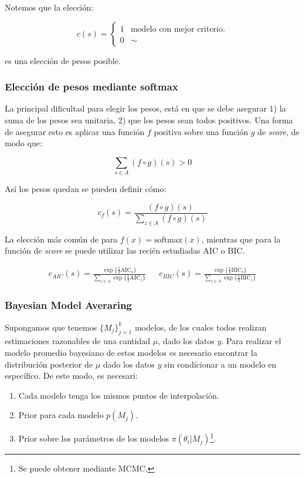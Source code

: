 Notemos que la elección:

\begin{equation}
c(s) =
\begin{cases}
1 & \text{modelo con mejor criterio.}\\
0 & \sim
\end{cases}
\end{equation}

es una elección de pesos posible.

\subsubsection{Elección de pesos mediante softmax}

La principal dificultad para elegir los pesos, está en que se debe asegurar 1) la suma de los pesos sea unitaria, 2) que los pesos sean todos positivos. Una forma de asegurar esto es aplicar una función $f$ positiva sobre una función $g$ de \emph{score}, de modo que:

\begin{equation}
\sum_{s\in A} (f\circ g)(s) > 0
\end{equation}

Así los pesos quedan se pueden definir cómo:

\begin{equation}
c_f(s) = \frac{(f\circ g)(s)}{\sum_{z\in A} (f\circ g)(s)}
\end{equation}

La elección más común de para $f(x) = \text{softmax}(x)$, mientras que para la función de \emph{score} se puede utilizar las recién estudiadas AIC o BIC.

\begin{align}
c_{AIC}(s) = \frac{\exp\{ \frac{1}{2} \text{AIC}_s\}}{\sum_{z\in A} \exp\{ \frac{1}{2} \text{AIC}_z\}} & & c_{BIC}(s) = \frac{\exp\{ \frac{1}{2} \text{BIC}_s\}}{\sum_{z\in A} \exp\{ \frac{1}{2} \text{BIC}_z\}}
\end{align}


\subsubsection{Bayesian Model Averaring}

Supongamos que tenemos $\{M_j\}_{j=1}^k$ modelos, de los cuales todos realizan estimaciones razonables de una cantidad $\mu$, dado los datos $y$.
Para realizar el modelo promedio bayesiano de estos modelos es necesario encontrar la distribución posterior de $\mu$ dado los datos $y$ sin condicionar a un modelo en específico. De este modo, es necesari:
\begin{enumerate}
    \item Cada modelo tenga los mismos puntos de interpolación.
    \item Prior para cada modelo $p(M_j)$.
    \item Prior sobre los parámetros de los modelos $\pi(\theta_i|M_j)$\footnote{Se puede obtener mediante MCMC.}.
\end{enumerate}


